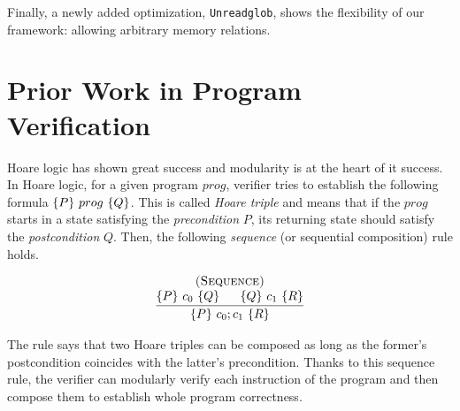 Finally, a newly added optimization, \texttt{Unreadglob}, shows the flexibility of our framework:
allowing arbitrary memory relations.





\section{Prior Work in Program Verification}\label{sec:overview:program}


Hoare logic has shown great success and modularity is at the heart of it success.
In Hoare logic, for a given program $prog$, verifier tries to establish the following formula $\{{P}\}~{prog}~\{{Q}\}$.
This is called {\it Hoare triple} and means that if the $prog$ starts in a state satisfying the {\it precondition} $P$,
its returning state should satisfy the {\it postcondition} $Q$.
Then, the following {\it sequence} (or sequential composition) rule holds.

\[
\infer
    {\hoare{P}{c_{0} ; c_{1}}{R}}
    {\deduce{\hoare{P}{c_{0}}{Q} \;\;\;\;\;\; \hoare{Q}{c_{1}}{R}}
      {\textsc{(Sequence)}}}
\]

\noindent The rule says that two Hoare triples can be composed as long as the former's postcondition coincides with the latter's precondition. Thanks to this sequence rule, the verifier can modularly verify each instruction of the program and then compose them to establish whole program correctness.



